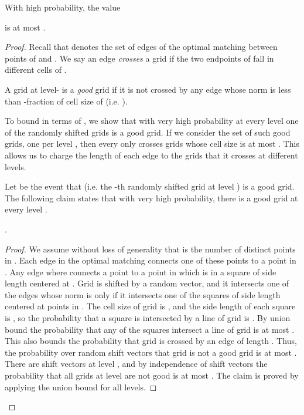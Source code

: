 \documentclass[oribibl]{llncs}
\begin{document}
\begin{lemma}\label{upperbound}
With high probability, the value

is at most .
\end{lemma}
\begin{proof}
Recall that  denotes the set of edges of the optimal matching
between points of  and . We say an edge  \textit{crosses} a
grid  if the two endpoints of  fall in different cells of .

\begin{definition}
A grid  at level- is a \textit{good} grid if it is not
crossed by any edge  whose  norm is less than
-fraction of cell
size of  (i.e. ).
\end{definition}

To bound  in terms of , we show that with very high probability
at every level one of the  randomly shifted grids is
a good grid. If we consider the set of such good grids, one per level ,
then every  only crosses grids whose cell size is at
most . This allows us to charge the length of each edge  to
the grids that it crosses at different levels.

Let  be the event that  (i.e. the -th randomly shifted grid
at level ) is a good grid.
The following claim states that with very high probability, there is
a good grid  at every level .

\begin{myclaim}\label{crossing}
.
\end{myclaim}
\begin{proof}
We assume without loss of generality that  is the number of distinct points
in . Each edge in the optimal matching connects one of these  points to a
point in . 
Any edge  where  connects a point  to a
point in  which is in
a square of side length  centered at .
Grid  is shifted by a random vector, and it intersects one of the edges
whose  norm is  only if it intersects one of the 
squares of side length  centered at points in . 
The cell size of grid  is , and the side length of each square is
, so the probability that a square is intersected by a line of
grid  is . By union bound the probability that
any of the  squares intersect a line of grid  is at most . 
This also bounds the probability that grid  is crossed by an edge of
length . Thus, the probability over random shift vectors that
grid  is not a good grid is at most .
There are  shift vectors at level , and by independence of
shift vectors the probability that all grids  at level
 are not good is at most 
.
The claim is proved by applying the union bound for all  levels.
\end{proof}


\end{proof}
\end{document}

